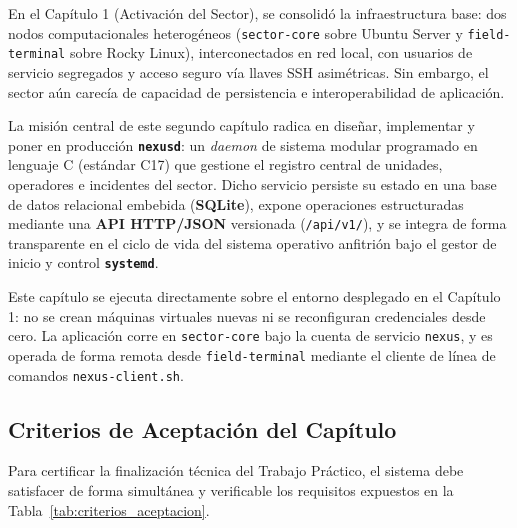\documentclass[10pt,a4paper]{article}
\begin{document}
En el Capítulo 1 (Activación del Sector), se consolidó la infraestructura base: dos nodos computacionales heterogéneos (\texttt{sector-core} sobre Ubuntu Server y \texttt{field-terminal} sobre Rocky Linux), interconectados en red local, con usuarios de servicio segregados y acceso seguro vía llaves SSH asimétricas. Sin embargo, el sector aún carecía de capacidad de persistencia e interoperabilidad de aplicación.

La misión central de este segundo capítulo radica en diseñar, implementar y poner en producción \textbf{\texttt{nexusd}}: un \textit{daemon} de sistema modular programado en lenguaje C (estándar C17) que gestione el registro central de unidades, operadores e incidentes del sector. Dicho servicio persiste su estado en una base de datos relacional embebida (\textbf{SQLite}), expone operaciones estructuradas mediante una \textbf{API HTTP/JSON} versionada (\texttt{/api/v1/}), y se integra de forma transparente en el ciclo de vida del sistema operativo anfitrión bajo el gestor de inicio y control \textbf{\texttt{systemd}}.

\begin{notabox}
    Este capítulo se ejecuta directamente sobre el entorno desplegado en el Capítulo 1: no se crean máquinas virtuales nuevas ni se reconfiguran credenciales desde cero. La aplicación corre en \texttt{sector-core} bajo la cuenta de servicio \texttt{nexus}, y es operada de forma remota desde \texttt{field-terminal} mediante el cliente de línea de comandos \texttt{nexus-client.sh}.
\end{notabox}

\subsection{Criterios de Aceptación del Capítulo}

Para certificar la finalización técnica del Trabajo Práctico, el sistema debe satisfacer de forma simultánea y verificable los requisitos expuestos en la Tabla~\ref{tab:criterios_aceptacion}.
\end{document}
